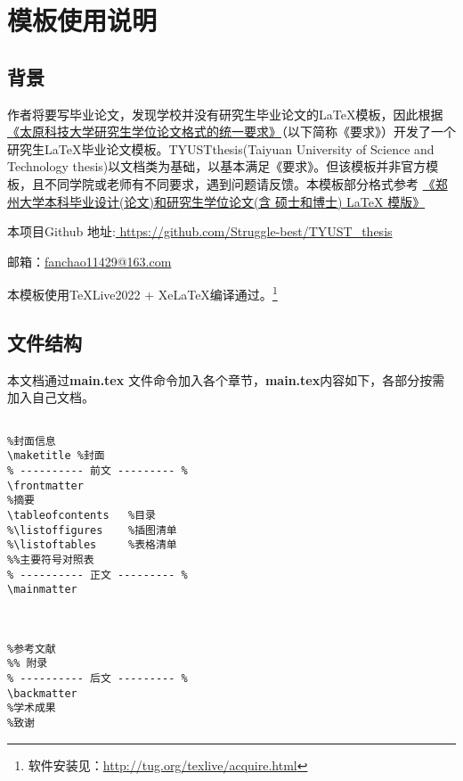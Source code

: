 \linespread{1.55}\selectfont
\chapter{模板使用说明}
\section{背景}
作者将要写毕业论文，发现学校并没有研究生毕业论文的\LaTeX 模板，因此根据\href{https://yjsxy.tyust.edu.cn/info/1172/3275.htm}{《太原科技大学研究生学位论文格式的统一要求》}（以下简称《要求》）开发了一个研究生\LaTeX 毕业论文模板。TYUSTthesis(Taiyuan University of Science and Technology thesis)以文档类为基础，以基本满足《要求》。但该模板并非官方模板，且不同学院或老师有不同要求，遇到问题请反馈。本模板部分格式参考
\href{https://github.com/tuxify/zzuthesis}{《郑州大学本科毕业设计(论文)和研究生学位论文(含 硕士和博士) LaTeX 模版》}

本项目Github 地址\faGithub :\href{https://github.com/Struggle-best/TYUST_thesis}{ \;\;https://github.com/Struggle-best/TYUST\_thesis}

邮箱：\href{fanchao11429@163.com}{fanchao11429@163.com}

本模板使用\TeX Live2022 + Xe\LaTeX 编译通过。\footnote{软件安装见：\url{http://tug.org/texlive/acquire.html}}
\section{文件结构}
本文档通过\textbf{main.tex} 文件\myverb{}命令加入各个章节，\textbf{main.tex}内容如下，各部分按需加入自己文档。

\begin{lstlisting}

%封面信息
\maketitle %封面
% ---------- 前文 --------- %
\frontmatter
%摘要
\tableofcontents   %目录
%\listoffigures    %插图清单
%\listoftables     %表格清单
%%主要符号对照表
% ---------- 正文 --------- %
\mainmatter



%参考文献
%% 附录
% ---------- 后文 --------- %
\backmatter
%学术成果
%致谢

\end{lstlisting}
